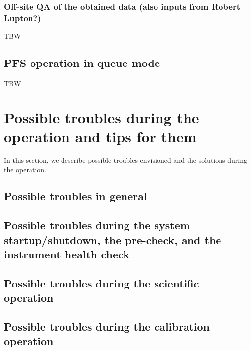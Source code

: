 \documentclass[a4paper]{article}
\begin{document}
\subsubsection{Off-site QA of the obtained data (also inputs from Robert Lupton?)}
TBW

\subsection{PFS operation in queue mode}
TBW 

\section{Possible troubles during the operation and tips for them}
In this section, we describe possible troubles envisioned and the
solutions during the operation.
\subsection{Possible troubles in general}
\subsection{Possible troubles during the system startup/shutdown, the pre-check, and the instrument health check}
\subsection{Possible troubles during the scientific operation}
\subsection{Possible troubles during the calibration operation}
\end{document}

